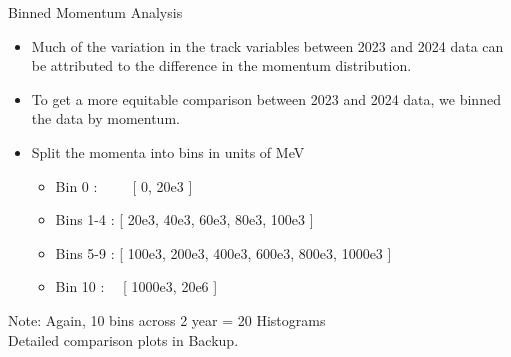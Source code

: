 \begin{frame}{Binned Momentum Analysis}
    \begin{itemize}
        \item Much of the variation in the track variables between 2023 and 2024 data can be attributed to the difference in the momentum distribution.
        \item To get a more equitable comparison between 2023 and 2024 data, we binned the data by momentum.
        \item Split the momenta into bins in units of MeV
        \begin{itemize}
            \item Bin 0 :\ \ \ \ \   [ 0, 20e3 ]
            \item Bins 1-4 : [ 20e3, 40e3, 60e3, 80e3, 100e3 ]
            \item Bins 5-9 :   [ 100e3, 200e3, 400e3, 600e3, 800e3, 1000e3 ]
            \item Bin 10 : \ \ [ 1000e3, 20e6 ]
        \end{itemize}
    \end{itemize}
    \vspace{0.8cm}
    \small{    
        Note: Again, 10 bins across 2 year = 20 Histograms \\
        Detailed comparison plots in Backup.
    }
\end{frame}

